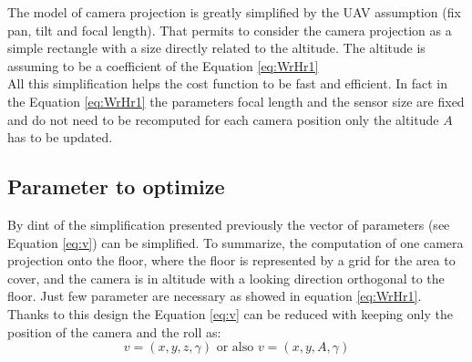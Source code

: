 The model of camera projection is greatly simplified by the UAV assumption (fix pan, tilt and focal length). That permits to consider the camera projection as a simple rectangle with a size directly related to the altitude. The altitude is assuming to be a coefficient of  the Equation \ref{eq:WrHr1}\\
All this simplification helps the cost function to be fast and efficient.  In fact in the Equation \ref{eq:WrHr1} the parameters focal length and the sensor size are fixed and do not need to be recomputed for each camera position only the altitude $A$ has to be updated.\\

\subsection{Parameter to optimize }\label{sec:parameterToOptimize}
By dint of the simplification presented previously the vector of parameters (see Equation \ref{eq:v}) can be simplified.
To summarize,  the computation of one camera projection onto the floor, where the floor is represented by a grid for the area to cover, and the camera is in altitude with a looking direction orthogonal to the floor. Just few parameter are necessary as showed in equation  \ref{eq:WrHr1}. Thanks to this design the Equation \ref{eq:v} can be reduced with keeping only the position of the camera and the roll as:
	\begin{equation}\label{eq:v2}
		v=(x,y,z,\gamma ) \text{ or also } v=(x,y,A,\gamma )
	\end{equation}


